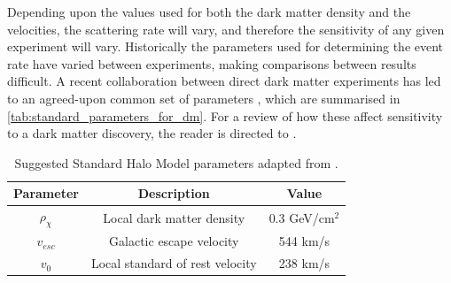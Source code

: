 \par
Depending upon the values used for both the dark matter density and the velocities, the scattering rate will vary, and therefore the sensitivity of any given experiment will vary.
Historically the parameters used for determining the event rate have varied between experiments, making comparisons between results difficult.
A recent collaboration between direct dark matter experiments has led to an agreed-upon common set of parameters \cite{standard_halo_model_conventions_ref}, which are summarised in \autoref{tab:standard_parameters_for_dm}.
For a review of how these affect sensitivity to a dark matter discovery, the reader is directed to \cite{dm_velocity_effects_on_limits_ref}.

\begin{table}[]
    \centering
    \begin{tabular}{c|c|c}
        Parameter                               & Description                       & Value         \\ \hline
        $\rho_{\chi}$                           & Local dark matter density         & 0.3 GeV/cm$^2$ \cite{shm_derivation_ref}           \\
        $v_{esc}$                             & Galactic escape velocity          & 544 km/s  \cite{dm_v_esc_ref}           \\
        $v_0$                             & Local standard of rest velocity   & 238 km/s   \cite{dm_v_0_ref}           
    \end{tabular}
    \caption{Suggested Standard Halo Model parameters adapted from \cite{standard_halo_model_conventions_ref}.}
    \label{tab:standard_parameters_for_dm}
\end{table}

